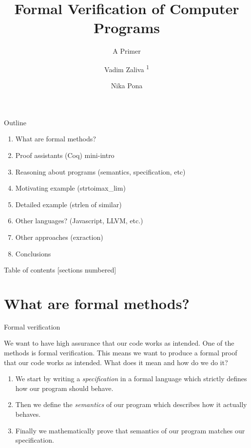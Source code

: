 \documentclass[10pt]{beamer}
\title{Formal Verification of Computer Programs}
\subtitle{A Primer}
\date{\date{}}
\author[shortname]{Vadim Zaliva \textsuperscript{1} \and Nika Pona \inst{2}}
\institute[shortinst]{\textsuperscript{1}Carnegie Mellon  University \and \inst{2} Digamma.ai}
\begin{document}
\maketitle

\begin{frame}{Outline}
    \begin{enumerate}
        \item What are formal methods?
        \item Proof assistants (Coq) mini-intro
        \item Reasoning about programs (semantics, specification, etc)
        \item Motivating example (strtoimax\_lim)
        \item Detailed example (strlen of similar)
        \item Other languages? (Javascript, LLVM, etc.)
        \item Other approaches (exraction)
        \item Conclusions
    \end{enumerate}
\end{frame}

\begin{frame}{Table of contents}
  [sections numbered]
  \tableofcontents[hideallsubsections]
\end{frame}



\section{What are formal methods?}
\begin{frame}{Formal verification}
 
  We want to have high assurance that our code works as intended. One of the methods is formal verification. This means we want to produce a formal proof that our code works as intended. What does it mean and how do we do it?
  
  \begin{enumerate}
  \item We start by writing a \emph{specification} in a formal language which strictly defines how our program should behave.
  \item Then we define the \emph{semantics} of our program which describes how it actually behaves. 
  \item Finally we mathematically prove that semantics of our program matches our specification.
\end{enumerate}
  
\end{frame}
\end{document}
